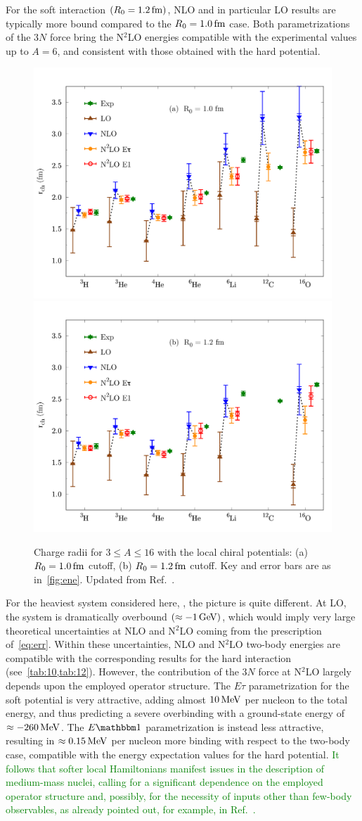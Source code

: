 \documentclass[aps,prc,twocolumn,superscriptaddress,floatfix]{revtex4-1}
\newcommand{\green}[1]{\protect\textcolor{green}{#1}}
\begin{document}
For the soft interaction $(R_0=1.2\,\rm fm)$, NLO and in particular LO results are 
typically more bound compared to the $R_0=1.0\,\rm fm$ case. Both parametrizations
of the $3N$ force bring the N$^2$LO energies compatible with the experimental 
values up to $A=6$, and consistent with those obtained with the hard potential. 

\begin{figure}[htb]
\includegraphics[width=0.48\linewidth]{rch_10.pdf}\qquad\includegraphics[width=0.48\linewidth]{rch_12.pdf}
\caption[]{Charge radii for $3\le A\le16$ with the local chiral potentials:
(a) $R_0=1.0\,\rm fm$ cutoff, (b) $R_0=1.2\,\rm fm$ cutoff. 
Key and error bars are as in~\cref{fig:ene}. Updated from Ref.~\cite{Lonardoni:2017afdmc}.}
\label{fig:rch}
\end{figure}

For the heaviest system considered here, , the picture is quite different. 
At LO, the system is dramatically overbound $(\approx -1\,\rm GeV)$, which would imply 
very large theoretical uncertainties at NLO and N$^2$LO coming from the prescription of~\cref{eq:err}.
Within these uncertainties, NLO and N$^2$LO two-body energies 
are compatible with the corresponding results for the hard interaction (see~\cref{tab:10,tab:12}).
However, the contribution of the $3N$ force at N$^2$LO largely depends upon
the employed operator structure. The $E\tau$ parametrization for the soft potential is very attractive,
adding almost $10\,\rm MeV$ per nucleon to the total energy, and thus
predicting a severe overbinding with a ground-state energy of $\approx -260\,\rm MeV$.
The $E\mathbbm1$ parametrization is instead less attractive, resulting in \green{$\approx 0.15\,\rm MeV$} per 
nucleon more binding with respect to the two-body case, compatible
with the energy expectation values for the hard potential.
\green{It follows that softer local Hamiltonians manifest issues in the description of medium-mass nuclei, 
calling for a significant dependence on the employed operator structure 
and, possibly, for the necessity of inputs other than few-body observables, as already pointed out, 
for example, in Ref.~\cite{Ekstrom:2015}.}
\end{document}
